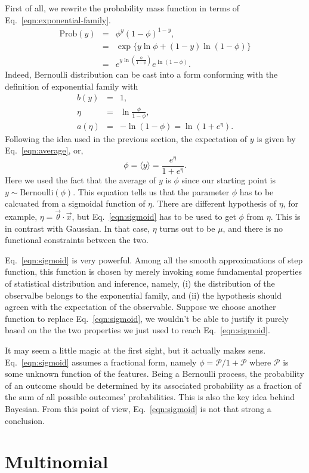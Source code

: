 First of all, we rewrite the probability mass function in terms of Eq.~\ref{eqn:exponential-family}.
\begin{eqnarray}
	\text{Prob}(y) &=& \phi^y(1-\phi)^{1-y},\\
		     &=& \exp\{y\ln\phi + (1-y)\ln(1-\phi)\}\\
	      &=&e^{y\ln\left(\frac{\phi}{1-\phi}\right)}e^{\ln(1-\phi)}.
\end{eqnarray}
Indeed, Bernoulli distribution can be cast into a form conforming with the definition of exponential family with
\begin{eqnarray}
	b(y) &=& 1,\\
	\eta &=& \ln\frac{\phi}{1-\phi},\\\label{eqn:logit}
	a(\eta) &=& -\ln(1-\phi) = \ln\left(1+e^\eta\right).\label{eqn:BernoulliLogP}
\end{eqnarray}
Following the idea used in the previous section, the expectation of $y$ is given by Eq.~\ref{eqn:average}, or,
\begin{equation}
	\phi = \langle y\rangle = \frac{e^\eta}{1+e^\eta}.\label{eqn:sigmoid}
\end{equation}
Here we used the fact that the average of $y$ is $\phi$ since our starting point is $y\sim\text{Bernoulli}(\phi)$. This equation tells us that the parameter $\phi$ has to be calcuated from a sigmoidal function of $\eta$. There are different hypothesis of $\eta$, for example, $\eta = \vec\theta\cdot\vec x$, but Eq.~\ref{eqn:sigmoid} has to be used to get $\phi$ from $\eta$. This is in contrast with Gaussian. In that case, $\eta$ turns out to be $\mu$, and there is no functional constraints between the two.

Eq.~\ref{eqn:sigmoid} is very powerful. Among all the smooth approximations of step function, this function is chosen by merely invoking some fundamental properties of statistical distribution and inference, namely, (i) the distribution of the observalbe belongs to the exponential family, and (ii) the hypothesis should agreen with the expectation of the observable. Suppose we choose another function to replace Eq.~\ref{eqn:sigmoid}, we wouldn't be able to justify it purely based on the the two properties we just used to reach Eq.~\ref{eqn:sigmoid}.

It may seem a little magic at the first sight, but it actually makes sens. Eq.~\ref{eqn:sigmoid} assumes a fractional form, namely $\phi = \mathcal P/1 + \mathcal P$ where $\mathcal P$ is some unknown function of the features. Being a Bernoulli process, the probability of an outcome should be determined by its associated probability as a fraction of the sum of all possible outcomes' probabilities. This is also the key idea behind Bayesian. From this point of view, Eq.~\ref{eqn:sigmoid} is not that strong a conclusion.
\section{Multinomial}

